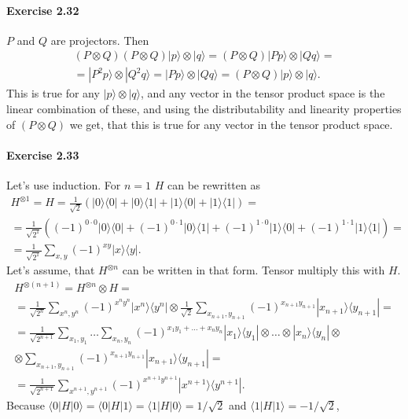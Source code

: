 \documentclass[a4paper,12pt]{article}
\newcommand{\exercise}[1]{\paragraph{Exercise #1}}
\newcommand{\la}{\langle}
\newcommand{\ra}{\rangle}
\begin{document}
    \exercise{2.32} $P$ and $Q$ are projectors. Then
    \begin{gather}
        \nonumber
        (P \otimes Q)(P \otimes Q) | p \ra \otimes | q \ra = (P \otimes Q) | Pp \ra \otimes | Qq \ra = \\
        = | P^2 p \ra \otimes | Q^2 q \ra = | Pp \ra \otimes | Qq \ra = (P \otimes Q) | p \ra \otimes | q \ra \textrm{.}
    \end{gather}
    This is true for any $| p \ra \otimes | q \ra$, and any vector in the tensor product space is the linear combination of these, and using the distributability and linearity properties of $(P \otimes Q)$ we get, that this is true for any vector in the tensor product space.

    \exercise{2.33} Let's use induction. For $n=1$ $H$ can be rewritten as
    \begin{gather}
        \nonumber
        H^{\otimes 1} = H = \frac{1}{\sqrt{2}} ( | 0 \ra \la 0 | + | 0 \ra \la 1 | + | 1 \ra \la 0 | + | 1 \ra \la 1 | ) = \\
        \nonumber
        = \frac{1}{\sqrt{2^1}} ( (-1)^{0 \cdot 0} | 0 \ra \la 0 | + (-1)^{0 \cdot 1} | 0 \ra \la 1 | + (-1)^{1 \cdot 0} | 1 \ra \la 0 | + (-1)^{1 \cdot 1} | 1 \ra \la 1 | ) = \\
        = \frac{1}{\sqrt{2^1}} \sum_{x, y} (-1)^{xy} | x \ra \la y | \textrm{.}
    \end{gather}
    Let's assume, that $H^{\otimes n}$ can be written in that form. Tensor multiply this with $H$.
    \begin{gather}
        \nonumber
        H^{\otimes (n+1)} = H^{\otimes n} \otimes H = \\
        \nonumber
        = \frac{1}{\sqrt{2^n}} \sum_{x^n, y^n} (-1)^{x^n y^n} |x^n \ra \la y^n | \otimes \frac{1}{\sqrt{2}} \sum_{x_{n+1}, y_{n+1}} (-1) ^ {x_{n+1} y_{n+1}} | x_{n+1} \ra \la y_{n+1} | = \\
        \nonumber
        = \frac{1}{\sqrt{2^{n+1}}} \sum_{x_1, y_1} \ldots \sum_{x_n, y_n} (-1)^{x_1 y_1 + \ldots + x_n y_n} |x_1 \ra \la y_1 | \otimes \ldots \otimes |x_n \ra \la y_n | \otimes \\
        \nonumber
        \otimes \sum_{x_{n+1}, y_{n+1}} (-1) ^ {x_{n+1} y_{n+1}} | x_{n+1} \ra \la y_{n+1} | = \\
        = \frac{1}{\sqrt{2^{n+1}}} \sum_{x^{n+1}, y^{n+1}} (-1)^{x^{n+1} y^{n+1}} |x^{n+1} \ra \la y^{n+1} | \textrm{.}
    \end{gather}
    Because $\la 0 | H | 0 \ra = \la 0 | H | 1 \ra = \la 1 | H | 0 \ra = 1 / \sqrt{2}$ and $\la 1 | H | 1 \ra = - 1 / \sqrt{2}$,
\end{document}
